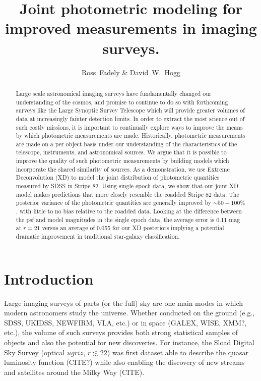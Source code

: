 \documentclass[12pt,preprint]{aastex}
\begin{document}
\title{Joint photometric modeling for improved measurements in imaging
surveys.}
\author{Ross~Fadely \&
        David~W.~Hogg}


%
%
\begin{abstract}
Large scale astronomical imaging surveys have fundamentally changed our 
understanding of the cosmos, and promise to continue to do so with forthcoming 
surveys like the Large Synoptic Survey Telescope which will provide greater 
volumes of data at increasingly fainter detection limits.  In order to extract
the most science out of such costly missions, it is important to continually
explore ways to improve the means by which photometric measurements are made.
Historically, photometric measurements are made on a per object basis under
our understanding of the characteristics of the telescope, instruments, and
astronomical sources.  We argue that it is possible to improve the quality of
such photometric measurements by building models which incorporate the shared
similarity of sources.  As a demonstration, we use Extreme Deconvolution (XD)
to model the joint distribution of photometric quantities measured by SDSS in
Stripe 82.  Using single epoch data, we show that our joint XD model makes
predictions that more closely resemble the coadded Stripe 82 data.  The
posterior variance of the photometric quantities are generally improved by
$\sim 50 - 100\%$, with little to no bias relative to the coadded data.
Looking at the difference between the psf and model magnitudes in the single
epoch data, the average error is 0.11 mag at $r=21$ versus an average of 0.055
for our XD posteriors implying a potential dramatic improvement in traditional
star-galaxy classification. 
\end{abstract}

%
%
\section{Introduction}

Large imaging surveys of parts (or the full) sky are one main modes in which
modern astronomers study the universe.  Whether conducted on the ground (e.g.,
SDSS, UKIDSS, NEWFIRM, VLA, etc.) or in space (GALEX, WISE, XMM?, etc.), the
volume of such surveys provides both strong statistical samples of objects and
also the potential for new discoveries.  For instance, the Sload Digital Sky
Survey (optical $ugriz$, $r\lesssim 22$) \citep{york00} was first dataset able
to describe the quasar luminosity function (CITE?) while also enabling the 
discovery of new streams and satellites around the Milky Way (CITE).
\end{document}
